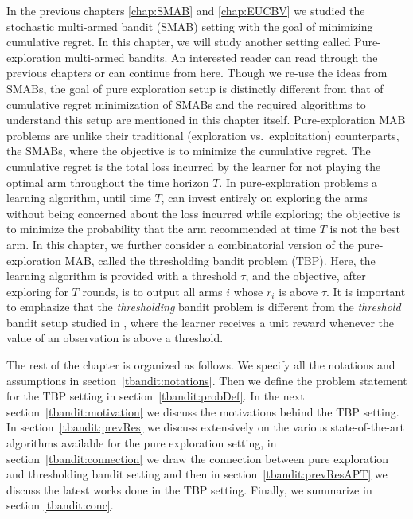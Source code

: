 In the previous chapters \ref{chap:SMAB} and \ref{chap:EUCBV} we studied the stochastic multi-armed bandit (SMAB) setting with the goal of minimizing cumulative regret. In this chapter, we will study another setting called Pure-exploration multi-armed bandits. An interested reader can read through the previous chapters or can continue from here. Though we re-use the ideas from SMABs, the goal of pure exploration setup is distinctly different from that of cumulative regret minimization of SMABs and the required algorithms to understand this setup are mentioned in this chapter itself. Pure-exploration MAB problems are unlike their traditional (exploration vs.\ exploitation)  counterparts, the SMABs, where the objective is to minimize the cumulative regret. The cumulative regret is the total loss incurred by the learner for not playing the optimal arm throughout the time horizon $T$. 
    In pure-exploration problems a learning algorithm, until time $T$, can invest entirely on exploring the arms without being concerned about the loss incurred while exploring; the objective is to minimize the probability that the arm recommended at time $T$ is not the best arm.  In this chapter, we further consider a combinatorial version of the pure-exploration MAB, called the thresholding bandit problem (TBP).  Here, the learning algorithm is provided with a threshold $\tau$, and the objective, after exploring for $T$ rounds, is to output all arms $i$ whose $r_{i}$ is above $\tau$. 
It is important to emphasize that the \emph{thresholding} bandit problem is different from the \emph{threshold} bandit setup studied in \cite{abernethy2016threshold}, where the learner receives a unit reward whenever the value of an observation is above a threshold. 

    The rest of the chapter is organized as follows. We specify all the notations and assumptions in section~\ref{tbandit:notations}. Then we define the problem statement for the TBP setting in section~\ref{tbandit:probDef}. In the next section~\ref{tbandit:motivation} we discuss the motivations behind the TBP setting. In section~\ref{tbandit:prevRes} we discuss extensively on the various state-of-the-art algorithms available for the pure exploration setting, in section~\ref{tbandit:connection} we draw the connection between pure exploration and thresholding bandit setting and then in section~\ref{tbandit:prevResAPT} we discuss the latest works done in the TBP setting. Finally, we summarize in section \ref{tbandit:conc}.

